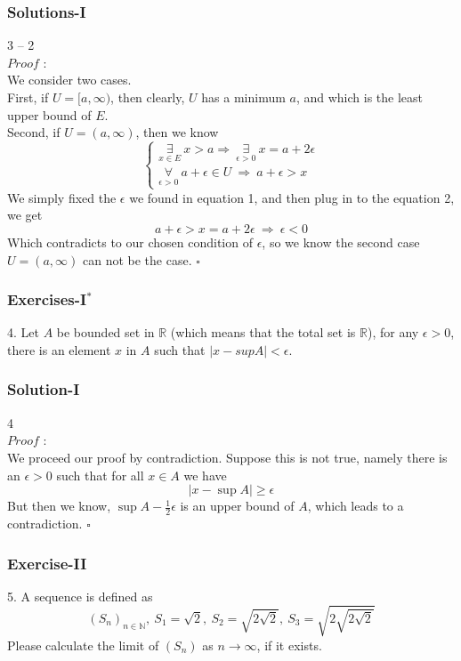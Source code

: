 \documentclass[12pt, t]{beamer}
\newcommand{\myqed}{\hfill$\square$}
\begin{document}
\begin{frame}
    \frametitle{Solutions-I}
    3 -- 2\\
    $Proof$ : \\
    We consider two cases.\\
    First, if $U=[a,\infty)$, then clearly, $U$ has a minimum $a$, and which is the least upper bound of $E$.\\
    Second, if $U=(a,\infty)$, then we know
    \begin{equation*}
        \begin{cases}
            \underset{x\in E}{\exists}\ x>a\Rightarrow\ \underset{\epsilon>0}{\exists}\ x=a+2\epsilon \\
            \underset{\epsilon>0}{\forall}\ a+\epsilon\in U\ \Rightarrow\ a+\epsilon>x
        \end{cases}
    \end{equation*}
    We simply fixed the $\epsilon$ we found in equation 1, and then plug in to the equation 2, we get
    \begin{equation*}
        a+\epsilon>x=a+2\epsilon\ \Rightarrow\ \epsilon<0
    \end{equation*}
    Which contradicts to our chosen condition of $\epsilon$, so we know the second case $U=(a,\infty)$ can not be the case.
    \myqed
\end{frame}


\begin{frame}
    \frametitle{Exercises-I$^*$}
    4. Let $A$ be bounded set in $\mathbb{R}$ (which means that the total set is $\mathbb{R}$), for any $\epsilon>0$,
    there is an element $x$ in $A$ such that $|x-supA|<\epsilon$.
\end{frame}

\begin{frame}
    \frametitle{Solution-I}
    4\\
    $Proof$ : \\
    \hspace{1em} We proceed our proof by contradiction. Suppose this is not true, namely there is an $\epsilon>0$ such
    that for all $x\in A$ we have
    \begin{equation*}
        |x-\sup A|\geq \epsilon
    \end{equation*}
    But then we know, $\sup A-\frac{1}{2}\epsilon$ is an upper bound of $A$, which leads to a contradiction.
    \myqed
\end{frame}

\begin{frame}
    \frametitle{Exercise-II}
    5. A sequence is defined as
    \begin{equation*}
        (S_n)_{n\in\mathbb{N}},\ S_1=\sqrt{2},\ S_2=\sqrt{2\sqrt{2}},\ S_3=\sqrt{2\sqrt{2\sqrt{2}}}
    \end{equation*}
    Please calculate the limit of $(S_n)$ as $n\rightarrow \infty$, if it exists.
\end{frame}
\end{document}
